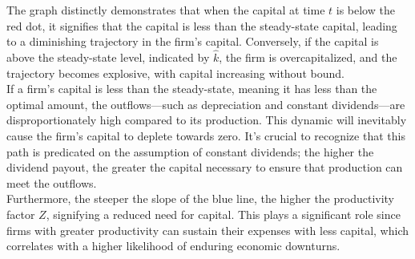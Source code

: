 \documentclass[12pt]{article}
\begin{document}
The graph distinctly demonstrates that when the capital at time \(t\) is below the red dot, it signifies that the
capital is less than the steady-state capital, leading to a diminishing trajectory in the firm's capital. Conversely, if
the capital is above the steady-state level, indicated by \(\widehat{k}\), the firm is overcapitalized, and the
trajectory becomes explosive, with capital increasing without bound. 
\\
If a firm's capital is less than the steady-state, meaning it has less than the optimal amount, the outflows—such as
depreciation and constant dividends—are disproportionately high compared to its production. This dynamic will inevitably
cause the firm's capital to deplete towards zero. It's crucial to recognize that this path is predicated on the
assumption of constant dividends; the higher the dividend payout, the greater the capital necessary to ensure that
production can meet the outflows. 
\\
Furthermore, the steeper the slope of the blue line, the higher the productivity factor \(Z\), signifying a reduced need
for capital. This plays a significant role since firms with greater productivity can sustain their expenses with less
capital, which correlates with a higher likelihood of enduring economic downturns. 
\vspace{1cm}
\end{document}
